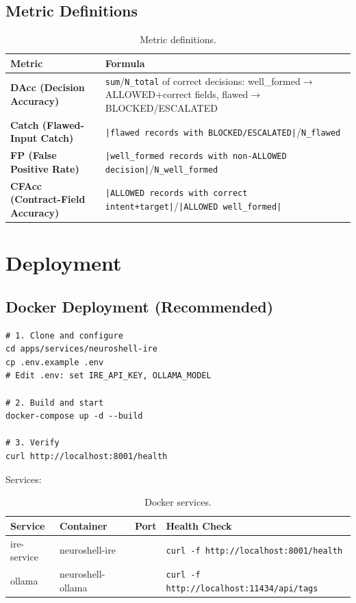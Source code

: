﻿\documentclass[10pt,journal,onecolumn]{IEEEtran}
\begin{document}
\subsection{Metric Definitions}
\begin{table}[h]
\caption{Metric definitions.}
\label{tab:metrics}
\begin{tabularx}{\columnwidth}{>{\bfseries}l X}
\toprule
\textbf{Metric} & \textbf{Formula}\\
\midrule
DAcc (Decision Accuracy) & \texttt{sum}/\texttt{N\_total} of correct decisions: well\_formed$\rightarrow$ALLOWED+correct fields, flawed$\rightarrow$BLOCKED/ESCALATED\\
Catch (Flawed-Input Catch) & \texttt{|flawed records with BLOCKED/ESCALATED|}/\texttt{N\_flawed}\\
FP (False Positive Rate) & \texttt{|well\_formed records with non-ALLOWED decision|}/\texttt{N\_well\_formed}\\
CFAcc (Contract-Field Accuracy) & \texttt{|ALLOWED records with correct intent+target|}/\texttt{|ALLOWED well\_formed|}\\
\bottomrule
\end{tabularx}
\end{table}
\section{Deployment}

\subsection{Docker Deployment (Recommended)}
\begin{lstlisting}
# 1. Clone and configure
cd apps/services/neuroshell-ire
cp .env.example .env
# Edit .env: set IRE_API_KEY, OLLAMA_MODEL

# 2. Build and start
docker-compose up -d --build

# 3. Verify
curl http://localhost:8001/health
\end{lstlisting}

Services:
\begin{table}[t]
\caption{Docker services.}
\label{tab:docker}
\begin{tabularx}{\textwidth}{>{\ttfamily}l >{\ttfamily}l >{\ttfamily}l >{\raggedright\arraybackslash}X}
\toprule
\textbf{Service} & \textbf{Container} & \textbf{Port} & \textbf{Health Check}\\
\midrule
ire-service & neuroshell-ire & 8001 & \texttt{curl -f http://localhost:8001/health}\\
ollama & neuroshell-ollama & 11434 & \texttt{curl -f http://localhost:11434/api/tags}\\
\bottomrule
\end{tabularx}
\end{table}
\end{document}
